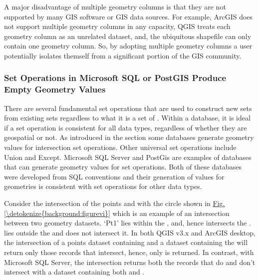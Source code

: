 \documentclass[a4paper,11pt,english]{sphinxmanual}
\begin{document}
A major disadvantage of multiple geometry columns is that they are not supported by many GIS software or GIS data sources.  For example, ArcGIS does not support multiple geometry columns in any capacity, QGIS treats each geometry column as an unrelated dataset, and, the ubiquitous shapefile can only contain one geometry column.  So, by adopting multiple geometry columns a user potentially isolates themself from a significant portion of the GIS community.


\subsubsection{Set Operations in Microsoft SQL or PostGIS Produce Empty Geometry Values}
\label{\detokenize{background:set-operations-in-microsoft-sql-or-postgis-produce-empty-geometry-values}}
There are several fundamental set operations that are used to construct new sets from existing sets regardless to what it is a set of .  Within a database, it is ideal if a set operation is consistent for all data types, regardless of whether they are geospatial or not.  As introduced in the section {\hyperref[\detokenize{background:empty}]{}} some databases generate  geometry values for intersection set operations.  Other universal set operations include Union and Except.  Microsoft SQL Server and PostGis are examples of databases that can generate  geometry values for set operations.  Both of these databases were developed from SQL conventions and their generation of  values for geometries is consistent with set operations for other data types.

Consider the intersection of the points  and  with the circle shown in \hyperref[\detokenize{background:figurevi}]{Fig.\@ \ref{\detokenize{background:figurevi}}} which is an example of an intersection between two geometry datasets.  ‘Pt1’ lies within the , and, hence intersects the .   lies outside the  and does not intersect it.  In both QGIS v3.x and ArcGIS desktop, the intersection of a points dataset containing  and a dataset containing the  will return only those records that intersect, hence, only  is returned.  In contrast, with Microsoft SQL Server, the intersection returns both the records that do and don’t intersect with a dataset containing both  and .
\end{document}
